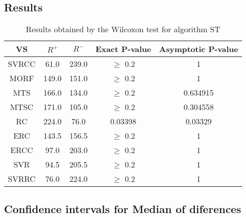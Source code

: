 \documentclass[a4paper,10pt]{article}
\begin{document}
\subsection{Results}

\begin{table}[!htp]
\centering\small
\begin{tabular}{
|c|c|c|c|c|}
\hline
 VS & $R^{+}$ & $R^{-}$ & Exact P-value & Asymptotic P-value \\ \hline 
SVRCC & 61.0 & 239.0 & $\geq$ 0.2 & 1\\ \hline 
MORF & 149.0 & 151.0 & $\geq$ 0.2 & 1\\ \hline 
MTS & 166.0 & 134.0 & $\geq$ 0.2 & 0.634915\\ \hline 
MTSC & 171.0 & 105.0 & $\geq$ 0.2 & 0.304558\\ \hline 
RC & 224.0 & 76.0 & 0.03398 & 0.03329\\ \hline 
ERC & 143.5 & 156.5 & $\geq$ 0.2 & 1\\ \hline 
ERCC & 97.0 & 203.0 & $\geq$ 0.2 & 1\\ \hline 
SVR & 94.5 & 205.5 & $\geq$ 0.2 & 1\\ \hline 
SVRRC & 76.0 & 224.0 & $\geq$ 0.2 & 1\\ \hline 

\end{tabular}
\caption{Results obtained by the Wilcoxon test for algorithm ST}
\end{table}

\subsection{Confidence intervals for Median of diferences}
\end{document}
